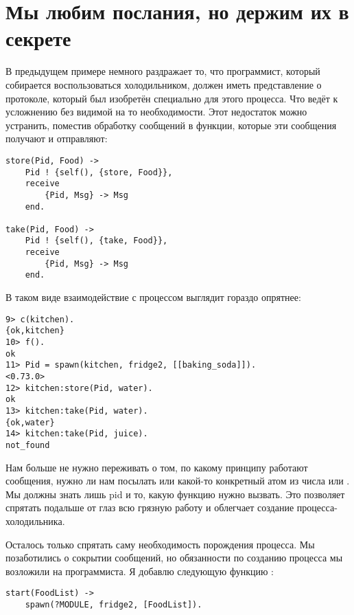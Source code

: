 \section{Мы любим послания, но держим их в секрете}
\label{we-love-messages-but-we-keep-them-secret}
В предыдущем примере немного раздражает то, что программист, который собирается воспользоваться холодильником, должен иметь представление о протоколе, который был изобретён специально для этого процесса.
Что ведёт к усложнению без видимой на то необходимости.
Этот недостаток можно устранить, поместив обработку сообщений в функции, которые эти сообщения получают и отправляют:
\begin{lstlisting}[style=erlang]
store(Pid, Food) ->
    Pid ! {self(), {store, Food}},
    receive
        {Pid, Msg} -> Msg
    end.
 
take(Pid, Food) ->
    Pid ! {self(), {take, Food}},
    receive
        {Pid, Msg} -> Msg
    end.
\end{lstlisting}

В таком виде взаимодействие с процессом выглядит гораздо опрятнее:
\begin{lstlisting}[style=erlang]
9> c(kitchen).
{ok,kitchen}
10> f().
ok
11> Pid = spawn(kitchen, fridge2, [[baking_soda]]).
<0.73.0>
12> kitchen:store(Pid, water).
ok
13> kitchen:take(Pid, water).
{ok,water}
14> kitchen:take(Pid, juice).
not_found
\end{lstlisting}

Нам больше не нужно переживать о том, по какому принципу работают сообщения, нужно ли нам посылать  или какой\--то конкретный атом из числа  или .
Мы должны знать лишь pid и то, какую функцию нужно вызвать.
Это позволяет спрятать подальше от глаз всю грязную работу и облегчает создание процесса\--холодильника.

Осталось только спрятать саму необходимость порождения процесса.
Мы позаботились о сокрытии сообщений, но обязанности по созданию процесса мы возложили на программиста.
Я добавлю следующую функцию :
\begin{lstlisting}[style=erlang]
start(FoodList) ->
    spawn(?MODULE, fridge2, [FoodList]).
\end{lstlisting}

